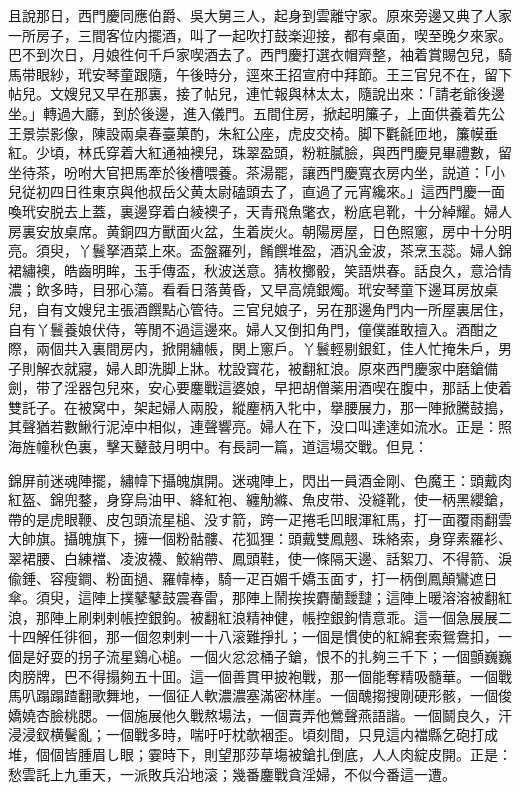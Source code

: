 且說那日，西門慶同應伯爵、吳大舅三人，起身到雲離守家。原來旁邊又典了人家一所房子，三間客位内擺酒，叫了一起吹打鼓楽迎接，都有桌面，喫至晚夕來家。巴不到次日，月娘徃何千戶家喫酒去了。西門慶打選衣帽齊整，袖着賞賜包兒，騎馬带眼紗，玳安琴童跟隨，午後時分，逕來王招宣府中拜節。王三官兒不在，留下帖兒。文嫂兒又早在那裏，接了帖兒，連忙報與林太太，隨說出來：「請老爺後邊坐。」轉過大廳，到於後邊，進入儀門。五間住房，掀起明簾子，上面供養着先公王景崇影像，陳設兩桌春臺菓酌，朱紅公座，虎皮交椅。脚下氍毹匝地，簾幙垂紅。少頃，林氏穿着大紅通袖襖兒，珠翠盈頭，粉粧膩臉，與西門慶見畢禮數，留坐待茶，吩咐大官把馬牽於後槽喂養。茶湯罷，讓西門慶寬衣房内坐，説道：「小兒従初四日徃東京與他叔岳父黄太尉磕頭去了，直過了元宵纔來。」這西門慶一面喚玳安脱去上蓋，裏邊穿着白綾襖子，天青飛魚氅衣，粉底皂靴，十分綽耀。婦人房裏安放桌席。黄銅四方獸面火盆，生着炭火。朝陽房屋，日色照窻，房中十分明亮。須臾，丫鬟拏酒菜上來。盃盤羅列，餚饌堆盈，酒汎金波，茶烹玉蕊。婦人錦裙繡襖，皓齒明眸，玉手傳盃，秋波送意。猜枚擲骰，笑語烘春。話良久，意洽情濃；飲多時，目邪心蕩。看看日落黄昏，又早高燒銀燭。玳安琴童下邊耳房放桌兒，自有文嫂兒主張酒饌點心管待。三官兒娘子，另在那邊角門内一所屋裏居住，自有丫鬟養娘伏侍，等閒不過這邊來。婦人又倒扣角門，僮僕誰敢擅入。酒酣之際，兩個共入裏間房内，掀開繡帳，関上窻戶。丫鬟輕剔銀釭，佳人忙掩朱戶，男子則解衣就寢，婦人即洗脚上牀。枕設寳花，被翻紅浪。原來西門慶家中磨鎗備劍，带了淫器包兒來，安心要鏖戰這婆娘，早把胡僧薬用酒喫在腹中，那話上使着雙託子。在被窝中，架起婦人兩股，縱麈柄入牝中，擧腰展力，那一陣掀騰鼓搗，其聲猶若數鰍行泥淖中相似，連聲響亮。婦人在下，没口叫達達如流水。正是：照海旌幢秋色裏，擊天鼙鼓月明中。有長詞一篇，道這場交戰。但見：

\begin{myquote}
錦屏前迷魂陣擺，繡幃下攝魄旗開。迷魂陣上，閃出一員酒金剛、色魔王：頭戴肉紅盔、錦兜鍪，身穿烏油甲、絳紅袍、纏觔縧、魚皮带、没縫靴，使一柄黑纓鎗，帶的是虎眼鞭、皮包頭流星槌、没す箭，跨一疋捲毛凹眼渾紅馬，打一面覆雨翻雲大帥旗。攝魄旗下，擁一個粉骷髏、花狐狸：頭戴雙鳳翹、珠絡索，身穿素羅衫、翠裙腰、白練襠、凌波襪、鮫綃帶、鳳頭鞋，使一條隔天邊、話絮刀、不得箭、淚偸錘、容瘦鐧、粉面撾、羅幃棒，騎一疋百媚千嬌玉面す，打一柄倒鳳顛鸞遮日傘。須臾，這陣上撲鼕鼕鼓震春雷，那陣上鬧挨挨麝蘭靉靆；這陣上暖溶溶被翻紅浪，那陣上刷剌剌帳控銀鉤。被翻紅浪精神健，帳控銀鉤情意乖。這一個急展展二十四解任徘徊，那一個忽剌剌一十八滚難掙扎；一個是慣使的紅綿套索鴛鴦扣，一個是好耍的拐子流星鷄心槌。一個火忿忿桶子鎗，恨不的扎夠三千下；一個顫巍巍肉膀牌，巴不得搨夠五十囬。這一個善貫甲披袍戰，那一個能奪精吸髓華。一個戰馬叭蹋蹋蹅翻歌舞地，一個征人軟濃濃塞滿密林崖。一個醜搊搜剛硬形骸，一個俊嬌嬈杏臉桃腮。一個施展他久戰熬場法，一個賣弄他鶯聲燕語諧。一個鬬良久，汗浸浸釵横鬢亂；一個戰多時，喘吁吁枕欹裀歪。頃刻間，只見這内襠縣乞砲打成堆，個個皆腫眉し眼；霎時下，則望那莎草塲被鎗扎倒底，人人肉綻皮開。正是：愁雲託上九重天，一派敗兵沿地滚；幾番鏖戰貪淫婦，不似今番這一遭。
\end{myquote}

